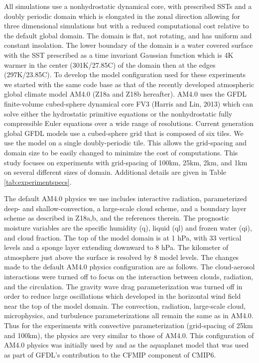 \documentclass[draft]{agujournal2019}
\begin{document}
All simulations use a nonhydrostatic dynamical core, with prescribed SSTs and a doubly periodic domain which is elongated in the zonal 
direction allowing for three dimensional simulations but with a reduced computational cost relative to the default global domain.  
The domain is flat, not rotating, and has uniform and constant insolation.
The lower boundary of the domain is a water covered surface with the SST prescribed as a time invariant Gaussian function 
which is 4K warmer in the center (301K/27.85C) of the domain then 
at the edges (297K/23.85C).  
To develop the model configuration used for these experiments we started with the same code base as that of the 
recently developed atmospheric global climate model AM4.0 \cite{Zhao_etal18a, Zhao_etal18b} (Z18a and Z18b hereafter).
AM4.0 uses the GFDL finite-volume cubed-sphere dynamical core FV3 (Harris and Lin, 2013) 
which can solve either the hydrostatic primitive equations or the nonhydrostatic fully compressible Euler equations
over a wide range of resolutions.   
Current generation global GFDL models use 
a cubed-sphere grid that is composed of six tiles.  We use the model on a single doubly-periodic
tile.  This allows the grid-spacing and domain size to be easily changed to minimize the cost of computations.
This study focuses on experiments with grid-spacing of 100km, 25km, 2km, and 1km on several different
sizes of domain.  Additional details are given in Table \ref{tab:experimentspecs}.  

The default AM4.0 physics we use includes interactive radiation, parameterized deep- and shallow-convection, 
a large-scale cloud scheme, and a boundary layer 
scheme as described in Z18a,b, and the references therein.  The prognostic moisture variables are the specific 
humidity (q), liquid (ql) and frozen water (qi), and cloud fraction.  The top of the model domain is at 1 hPa, with 33 vertical 
levels and a sponge layer extending downward to 8 hPa.  The kilometer of atmosphere just above the surface is resolved by 
8 model levels.  The changes made to the default AM4.0 physics configuration are as follows.  The cloud-aerosol 
interactions were turned off to focus on the interaction between clouds, radiation, and the circulation.  The gravity wave drag 
parameterization was turned off 
in order to reduce large oscillations which developed in the horizontal wind field near the top of the model domain.  
The convection, radiation, large-scale cloud, microphysics, and turbulence parameterizations all remain the same 
as in AM4.0.   Thus for the experiments with convective parameterization (grid-spacing of 25km and 100km), the 
physics are very similar to those of AM4.0.  
This configuration of AM4.0 physics was initially used by  and as the aquaplanet model that 
was used as part of GFDL's contribution to the CFMIP component of CMIP6.  
\end{document}
